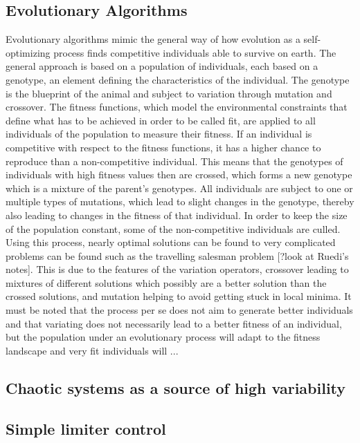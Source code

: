 \documentclass[main]{subfiles}
\begin{document}
\subsection{Evolutionary Algorithms}

Evolutionary algorithms mimic the general way of how evolution as a self-optimizing process finds competitive individuals able to survive on earth. The general approach is based on a population of individuals, each based on a genotype, an element defining the characteristics of the individual. The genotype is the blueprint of the animal and subject to variation through mutation and crossover. The fitness functions, which model the environmental constraints that define what has to be achieved in order to be called fit, are applied to all individuals of the population to measure their fitness. If an individual is competitive with respect to the fitness functions, it has a higher chance to reproduce than a non-competitive individual. This means that the genotypes of individuals with high fitness values then are crossed, which forms a new genotype which is a mixture of the parent's genotypes. All individuals are subject to one or multiple types of mutations, which lead to slight changes in the genotype, thereby also leading to changes in the fitness of that individual. In order to keep the size of the population constant, some of the non-competitive individuals are culled. Using this process, nearly optimal solutions can be found to very complicated problems can be found such as the travelling salesman problem [?look at Ruedi's notes]. This is due to the features of the variation operators, crossover leading to mixtures of different solutions which possibly are a better solution than the crossed solutions, and mutation helping to avoid getting stuck in local minima. It must be noted that the process per se does not aim to generate better individuals and that variating does not necessarily lead to a better fitness of an individual, but the population under an evolutionary process will adapt to the fitness landscape and very fit individuals will ...


\subsection{Chaotic systems as a source of high variability}

\lipsum[1]



\subsection{Simple limiter control}

\lipsum[1]

\end{document}
